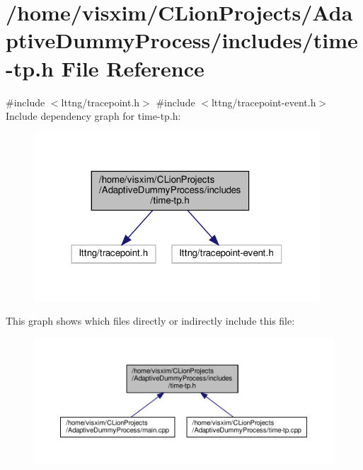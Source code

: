 \hypertarget{time-tp_8h}{}\section{/home/visxim/\+C\+Lion\+Projects/\+Adaptive\+Dummy\+Process/includes/time-\/tp.h File Reference}
\label{time-tp_8h}
{\ttfamily \#include $<$lttng/tracepoint.\+h$>$}\newline
{\ttfamily \#include $<$lttng/tracepoint-\/event.\+h$>$}\newline
Include dependency graph for time-\/tp.h\+:
\nopagebreak
\begin{figure}[H]
\begin{center}
\leavevmode
\includegraphics[width=303pt]{time-tp_8h__incl}
\end{center}
\end{figure}
This graph shows which files directly or indirectly include this file\+:
\nopagebreak
\begin{figure}[H]
\begin{center}
\leavevmode
\includegraphics[width=350pt]{time-tp_8h__dep__incl}
\end{center}
\end{figure}
